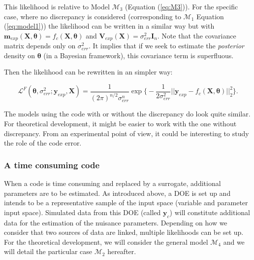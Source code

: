 \documentclass[soumission]{jsfds}
\newcommand{\posterior}{\textit{posterior }}
\newcommand{\EqRef}[1] {Equation (\ref{#1})}
\edef\hc{\string: }
\begin{document}
This likelihood is relative to Model $\mathcal{M}_3$ (\EqRef{eq:M3}). For the specific case, where no discrepancy is considered (corresponding to $\mathcal{M}_1$ \EqRef{eq:model1}) the likelihood can be written in a similar way but with $\boldsymbol{m}_{exp}(\boldsymbol{X},\boldsymbol{\theta})= f_c(\boldsymbol{X},\boldsymbol{\theta})$ and $\boldsymbol{V}_{exp}(\boldsymbol{X})=\sigma_{err}^2\boldsymbol{I}_n$. Note that the covariance matrix depends only on $\sigma_{err}^2$. It implies that if we seek to estimate the \posterior density on $\boldsymbol{\theta}$ (in a Bayesian framework), this covariance term is superfluous.\newline


Then the likelihood can be rewritten in an simpler way\hc

\begin{equation}
\mathcal{L}^F(\boldsymbol{\theta},\sigma_{err}^2;\boldsymbol{y}_{exp},\boldsymbol{X})=\frac{1}{(2\pi)^{n/2}\sigma_{err}^{n}}\exp\Bigg\{-\frac{1}{2\sigma_{err}^2}||\boldsymbol{y}_{exp}-f_c(\boldsymbol{X},\boldsymbol{\theta})||_2^2\Bigg\}.
\label{eq:LikelihoodQuick}
\end{equation}

The models using the code with or without the discrepancy do look quite similar. For theoretical development, it might be easier to work with the one without discrepancy. From an experimental point of view, it could be interesting to study the role of the code error. \newline

\subsubsection{A time consuming code}

\noindent When a code is time consuming and replaced by a surrogate, additional parameters are to be estimated. As introduced above, a DOE is set up and intends to be a representative sample of the input space (variable and parameter input space). Simulated data from this DOE (called $\boldsymbol{y}_c$) will constitute additional data for the estimation of the nuisance parameters. Depending on how we consider that two sources of data are linked, 
multiple likelihoods can be set up. For the theoretical development, we will consider the general model $\mathcal{M}_4$ and we will detail the particular case $\mathcal{M}_2$ hereafter.\newline
\end{document}
